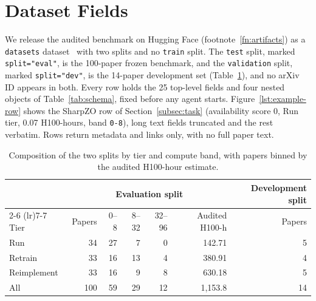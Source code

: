 \clearpage  %
\section{Dataset Fields}
\label{app:dataset-schema}

We release the audited benchmark on Hugging Face (footnote~\ref{fn:artifacts}) as a
\texttt{datasets} dataset~\citep{lhoest2021datasets} with two splits and no \texttt{train}
split. The \texttt{test} split, marked \texttt{split="eval"}, is the 100-paper
frozen benchmark, and the \texttt{validation} split, marked \texttt{split="dev"},
is the 14-paper development set (Table~\ref{tab:splits}), and no arXiv ID
appears in both. Every row holds the 25 top-level fields and four nested objects of
Table~\ref{tab:schema}, fixed before any agent starts. Figure~\ref{lst:example-row} shows the SharpZO row of
Section~\ref{subsec:task} (availability score 0, Run tier, 0.07 H100-hours, band
\texttt{0-8}), long text fields truncated and the rest verbatim. Rows return
metadata and links only, with no full paper text.

\begin{table}[ht]
\centering
\small
\begin{tabular}{@{}lrrrrrr@{}}
\toprule
& \multicolumn{5}{c}{Evaluation split} & Development split \\
\cmidrule(lr){2-6} \cmidrule(lr){7-7}
Tier & Papers & 0--8 & 8--32 & 32--96 & Audited H100-h & Papers \\
\midrule
Run         & 34  & 27 & 7  & 0  & 142.71    & 5  \\
Retrain     & 33  & 16 & 13 & 4  & 380.91    & 4  \\
Reimplement & 33  & 16 & 9  & 8  & 630.18    & 5  \\
\midrule
All         & 100 & 59 & 29 & 12 & 1{,}153.8 & 14 \\
\bottomrule
\end{tabular}
\caption{Composition of the two splits by tier and compute band, with papers
binned by the audited H100-hour estimate.}
\label{tab:splits}
\end{table}

